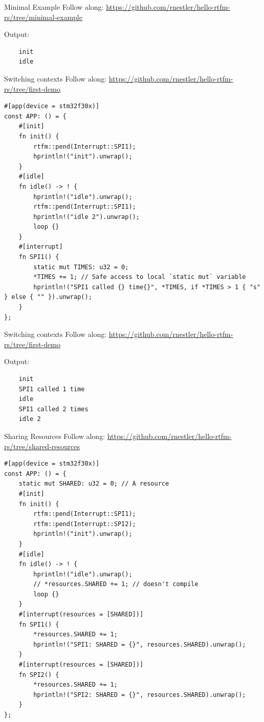 \documentclass[aspectratio=1610,14pt,t]{beamer}
\begin{document}
\begin{frame}[fragile]{Minimal Example}
  \small{Follow along: \url{https://github.com/rnestler/hello-rtfm-rs/tree/minimal-example}}

  Output:
  \begin{verbatim}
    init
    idle
  \end{verbatim}
\end{frame}

\begin{frame}[fragile]{Switching contexts}
  \small{Follow along: \url{https://github.com/rnestler/hello-rtfm-rs/tree/first-demo}}
  \begin{verbatim}
#[app(device = stm32f30x)]
const APP: () = {
    #[init]
    fn init() {
        rtfm::pend(Interrupt::SPI1);
        hprintln!("init").unwrap();
    }
    #[idle]
    fn idle() -> ! {
        hprintln!("idle").unwrap();
        rtfm::pend(Interrupt::SPI1);
        hprintln!("idle 2").unwrap();
        loop {}
    }
    #[interrupt]
    fn SPI1() {
        static mut TIMES: u32 = 0;
        *TIMES += 1; // Safe access to local `static mut` variable
        hprintln!("SPI1 called {} time{}", *TIMES, if *TIMES > 1 { "s" } else { "" }).unwrap();
    }
};
  \end{verbatim}
\end{frame}


\begin{frame}[fragile]{Switching contexts}
  \small{Follow along: \url{https://github.com/rnestler/hello-rtfm-rs/tree/first-demo}}

  Output:
  \begin{verbatim}
    init
    SPI1 called 1 time
    idle
    SPI1 called 2 times
    idle 2
  \end{verbatim}
\end{frame}

\begin{frame}[fragile]{Sharing Resources}
  \tiny{Follow along: \url{https://github.com/rnestler/hello-rtfm-rs/tree/shared-resources}}
  \begin{verbatim}
#[app(device = stm32f30x)]
const APP: () = {
    static mut SHARED: u32 = 0; // A resource
    #[init]
    fn init() {
        rtfm::pend(Interrupt::SPI1);
        rtfm::pend(Interrupt::SPI2);
        hprintln!("init").unwrap();
    }
    #[idle]
    fn idle() -> ! {
        hprintln!("idle").unwrap();
        // *resources.SHARED += 1; // doesn't compile
        loop {}
    }
    #[interrupt(resources = [SHARED])]
    fn SPI1() {
        *resources.SHARED += 1;
        hprintln!("SPI1: SHARED = {}", resources.SHARED).unwrap();
    }
    #[interrupt(resources = [SHARED])]
    fn SPI2() {
        *resources.SHARED += 1;
        hprintln!("SPI2: SHARED = {}", resources.SHARED).unwrap();
    }
};
  \end{verbatim}
\end{frame}
\end{document}
